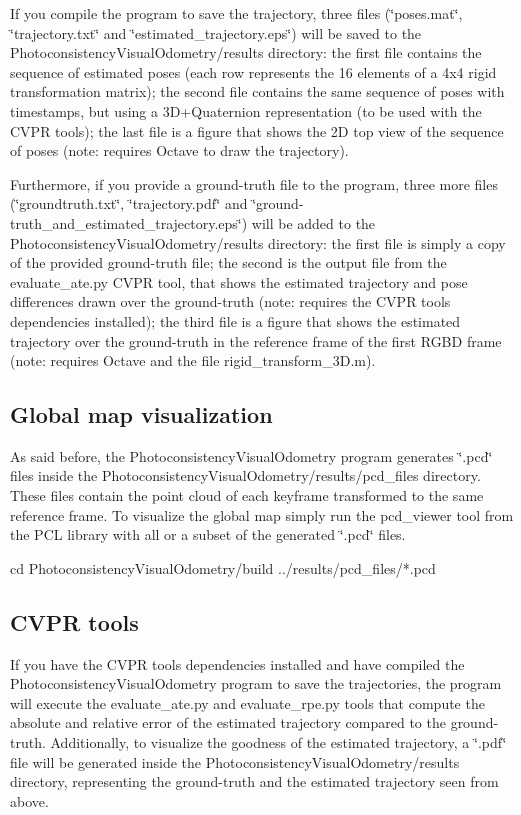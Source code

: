 If you compile the program to save the trajectory, three files (\char`\"{}poses.mat\char`\"{}, \char`\"{}trajectory.txt\char`\"{} and \char`\"{}estimated\_\-trajectory.eps\char`\"{}) will be saved to the PhotoconsistencyVisualOdometry/results directory: the first file contains the sequence of estimated poses (each row represents the 16 elements of a 4x4 rigid transformation matrix); the second file contains the same sequence of poses with timestamps, but using a 3D+Quaternion representation (to be used with the CVPR tools); the last file is a figure that shows the 2D top view of the sequence of poses (note: requires Octave to draw the trajectory).

Furthermore, if you provide a ground-\/truth file to the program, three more files (\char`\"{}groundtruth.txt\char`\"{}, \char`\"{}trajectory.pdf\char`\"{} and \char`\"{}ground-\/truth\_\-and\_\-estimated\_\-trajectory.eps\char`\"{}) will be added to the PhotoconsistencyVisualOdometry/results directory: the first file is simply a copy of the provided ground-\/truth file; the second is the output file from the evaluate\_\-ate.py CVPR tool, that shows the estimated trajectory and pose differences drawn over the ground-\/truth (note: requires the CVPR tools dependencies installed); the third file is a figure that shows the estimated trajectory over the ground-\/truth in the reference frame of the first RGBD frame (note: requires Octave and the file rigid\_\-transform\_\-3D.m).\hypertarget{index_A}{}\subsection{Global map visualization}\label{index_A}
As said before, the PhotoconsistencyVisualOdometry program generates \char`\"{}.pcd\char`\"{} files inside the PhotoconsistencyVisualOdometry/results/pcd\_\-files directory. These files contain the point cloud of each keyframe transformed to the same reference frame. To visualize the global map simply run the pcd\_\-viewer tool from the PCL library with all or a subset of the generated \char`\"{}.pcd\char`\"{} files.

\begin{DoxyVerb}
cd PhotoconsistencyVisualOdometry/build
../results/pcd_files/*.pcd 
\end{DoxyVerb}


 \hypertarget{index_B}{}\subsection{CVPR tools}\label{index_B}
If you have the CVPR tools dependencies installed and have compiled the PhotoconsistencyVisualOdometry program to save the trajectories, the program will execute the evaluate\_\-ate.py and evaluate\_\-rpe.py tools that compute the absolute and relative error of the estimated trajectory compared to the ground-\/truth. Additionally, to visualize the goodness of the estimated trajectory, a \char`\"{}.pdf\char`\"{} file will be generated inside the PhotoconsistencyVisualOdometry/results directory, representing the ground-\/truth and the estimated trajectory seen from above.


